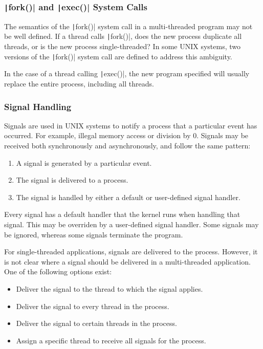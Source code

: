 \documentclass{article}
\begin{document}
\subsubsection{\texttt|fork()| and \texttt|exec()| System Calls}
The semantics of the \texttt|fork()| system call in a
multi-threaded program may not be well defined. If a thread calls
\texttt|fork()|, does the new process duplicate all threads, or
is the new process single-threaded? In some UNIX systems, two versions
of the \texttt|fork()| system call are defined to address this
ambiguity.

In the case of a thread calling \texttt|exec()|, the new program
specified will usually replace the entire process, including all
threads.
\subsubsection{Signal Handling}
Signals are used in UNIX systems to notify a process that a particular
event has occurred. For example, illegal memory access or division by
0. Signals may be received both synchronously and asynchronously, and
follow the same pattern:
\begin{enumerate}
    \item A signal is generated by a particular event.
    \item The signal is delivered to a process.
    \item The signal is handled by either a default or user-defined
          signal handler.
\end{enumerate}
Every signal has a default handler that the kernel runs when handling
that signal. This may be overriden by a user-defined signal handler.
Some signals may be ignored, whereas some signals terminate the program.

For single-threaded applications, signals are delivered to the process.
However, it is not clear where a signal should be delivered in a
multi-threaded application. One of the following options exist:
\begin{itemize}
    \item Deliver the signal to the thread to which the signal applies.
    \item Deliver the signal to every thread in the process.
    \item Deliver the signal to certain threads in the process.
    \item Assign a specific thread to receive all signals for the
          process.
\end{itemize}
\end{document}
